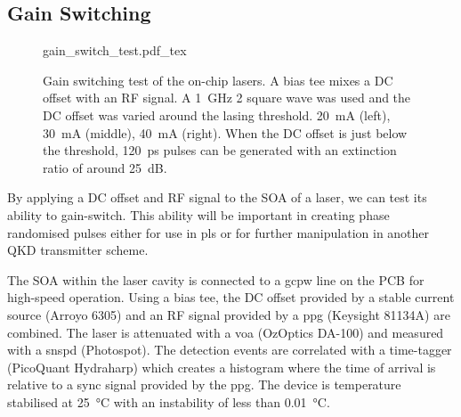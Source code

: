 

\subsection{Gain Switching}

\begin{figure}[tp]
	\centering
	\small	
	\def\svgwidth{\textwidth} 
	{gain_switch_test.pdf_tex}
	\caption[Gain switching test of the HHI on-chip lasers]{Gain switching test of the on-chip lasers. A bias tee mixes a DC offset with an RF signal. A \SI{1}{GHz} \SI{2}{\Vpp} square wave was used and the DC offset was varied around the lasing threshold. \SI{20}{mA} (left), \SI{30}{\mA} (middle), \SI{40}{\mA} (right). When the DC offset is just below the threshold, \SI{120}{ps} pulses can be generated with an extinction ratio of around \SI{25}{dB}.}
	\label{fig:gain_switch_test}
\end{figure}

By applying a DC offset and RF signal to the \ac{SOA} of a laser, we can test its ability to gain-switch. This ability will be important in creating phase randomised pulses either for use in \ac{pls} or for further manipulation in another \ac{QKD} transmitter scheme.


The \ac{SOA} within the laser cavity is connected to a \ac{gcpw} line on the PCB for high-speed operation. Using a bias tee, the DC offset provided by a stable current source (Arroyo 6305) and an RF signal provided by a \ac{ppg} (Keysight 81134A) are combined. The laser is attenuated with a \ac{voa} (OzOptics DA-100) and measured with a \ac{snspd} (Photospot). The detection events are correlated with a time-tagger (PicoQuant Hydraharp) which creates a histogram where the time of arrival is relative to a sync signal provided by the \ac{ppg}. The device is temperature stabilised at \SI{25}{\celsius} with an instability of less than \SI{0.01}{\celsius}.

